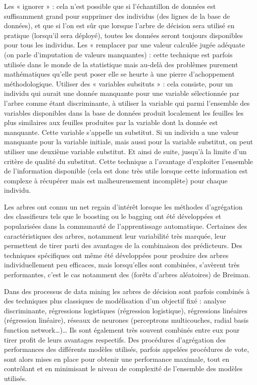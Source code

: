     Les « ignorer » : cela n'est possible que si l'échantillon de données est suffisamment grand pour supprimer des individus (des lignes de la base de données), et que si l'on est sûr que lorsque l'arbre de décision sera utilisé en pratique (lorsqu'il sera déployé), toutes les données seront toujours disponibles pour tous les individus.
    Les « remplacer par une valeur calculée jugée adéquate (on parle d'imputation de valeurs manquantes) : cette technique est parfois utilisée dans le monde de la statistique mais au-delà des problèmes purement mathématiques qu'elle peut poser elle se heurte à une pierre d'achoppement méthodologique.
    Utiliser des « variables subsituts » : cela consiste, pour un individu qui aurait une donnée manquante pour une variable sélectionnée par l'arbre comme étant discriminante, à utiliser la variable qui parmi l'ensemble des variables disponibles dans la base de données produit localement les feuilles les plus similaires aux feuilles produites par la variable dont la donnée est manquante. Cette variable s'appelle un substitut. Si un individu a une valeur manquante pour la variable initiale, mais aussi pour la variable substitut, on peut utiliser une deuxième variable substitut. Et ainsi de suite, jusqu'à la limite d'un critère de qualité du substitut. Cette technique a l'avantage d'exploiter l'ensemble de l'information disponible (cela est donc très utile lorsque cette information est complexe à récupérer mais est malheureusement incomplète) pour chaque individu.

Les arbres ont connu un net regain d’intérêt lorsque les méthodes d’agrégation des classifieurs tels que le boosting ou le bagging ont été développées et popularisées dans la communauté de l’apprentissage automatique. Certaines des caractéristiques des arbres, notamment leur variabilité très marquée, leur permettent de tirer parti des avantages de la combinaison des prédicteurs. Des techniques spécifiques ont même été développées pour produire des arbres individuellement peu efficaces, mais lorsqu’elles sont combinées, s’avèrent très performantes, c’est le cas notamment des (forêts d'arbres aléatoires) de Breiman.

Dans des processus de data mining les arbres de décision sont parfois combinés à des techniques plus classiques de modélisation d'un objectif fixé : analyse discriminante, régressions logistiques (régression logistique), régressions linéaires (régression linéaire), réseaux de neurones (perceptrons multicouches, radial basis function network…)… Ils sont également très souvent combinés entre eux pour tirer profit de leurs avantages respectifs. Des procédures d'agrégation des performances des différents modèles utilisés, parfois appelées procédures de vote, sont alors mises en place pour obtenir une performance maximale, tout en contrôlant et en minimisant le niveau de complexité de l'ensemble des modèles utilisés.






